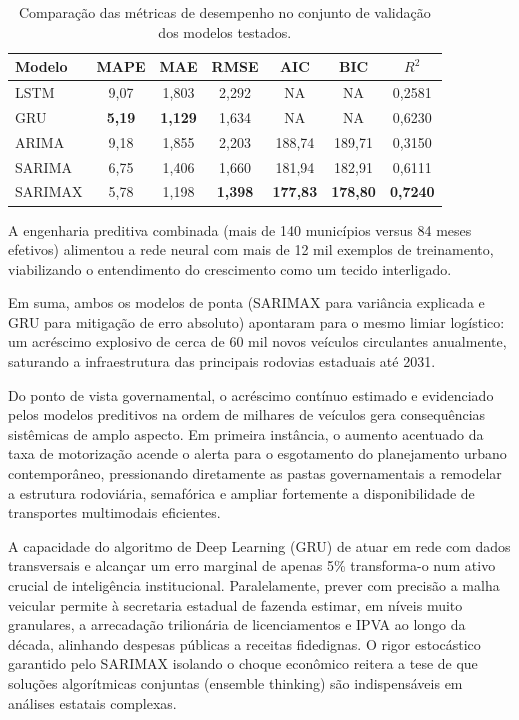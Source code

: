 \documentclass[12pt,a4paper]{article}
\begin{document}
\begin{table}[!ht]
\renewcommand{\arraystretch}{0.9}
\centering
\caption{Comparação das métricas de desempenho no conjunto de validação dos modelos testados.}
\label{tab:comparacao_modelos}

\begin{tabular}{lcccccc}
\toprule
\textbf{Modelo} & \textbf{MAPE} & \textbf{MAE} & \textbf{RMSE} & \textbf{AIC} & \textbf{BIC} & \textbf{$R^2$} \\
\midrule
LSTM    & 9,07 & 1,803 & 2,292 & NA & NA & 0,2581 \\
GRU     & \textbf{5,19} & \textbf{1,129} & 1,634 & NA & NA & 0,6230 \\
ARIMA   & 9,18 & 1,855 & 2,203 & 188,74 & 189,71 & 0,3150 \\
SARIMA  & 6,75 & 1,406 & 1,660 & 181,94 & 182,91 & 0,6111 \\
SARIMAX & 5,78 & 1,198 & \textbf{1,398} & \textbf{177,83} & \textbf{178,80} & \textbf{0,7240} \\
\bottomrule
\end{tabular}%

\end{table}

A engenharia preditiva combinada (mais de 140 municípios versus 84 meses efetivos) alimentou a rede neural com mais de 12 mil exemplos de treinamento, viabilizando o entendimento do crescimento como um tecido interligado. 

Em suma, ambos os modelos de ponta (SARIMAX para variância explicada e GRU para mitigação de erro absoluto) apontaram para o mesmo limiar logístico: um acréscimo explosivo de cerca de 60 mil novos veículos circulantes anualmente, saturando a infraestrutura das principais rodovias estaduais até 2031.

Do ponto de vista governamental, o acréscimo contínuo estimado e evidenciado pelos modelos preditivos na ordem de milhares de veículos gera consequências sistêmicas de amplo aspecto. Em primeira instância, o aumento acentuado da taxa de motorização acende o alerta para o esgotamento do planejamento urbano contemporâneo, pressionando diretamente as pastas governamentais a remodelar a estrutura rodoviária, semafórica e ampliar fortemente a disponibilidade de transportes multimodais eficientes.

A capacidade do algoritmo de Deep Learning (GRU) de atuar em rede com dados transversais e alcançar um erro marginal de apenas 5\% transforma-o num ativo crucial de inteligência institucional. Paralelamente, prever com precisão a malha veicular permite à secretaria estadual de fazenda estimar, em níveis muito granulares, a arrecadação trilionária de licenciamentos e IPVA ao longo da década, alinhando despesas públicas a receitas fidedignas. O rigor estocástico garantido pelo SARIMAX isolando o choque econômico reitera a tese de que soluções algorítmicas conjuntas (ensemble thinking) são indispensáveis em análises estatais complexas.
\end{document}
